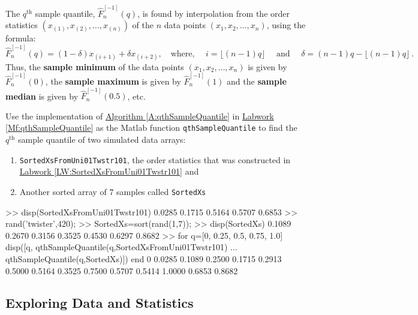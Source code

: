 The $q^{\text{th}}$ sample quantile, $ \widehat{F}_n^{[-1]}(q)$, is found by interpolation from the order statistics $(x_{(1)},x_{(2)},\ldots,x_{(n)})$ of the $n$ data points $(x_1,x_2,\ldots,x_n)$, using the formula:
\[
 \widehat{F}_n^{[-1]}(q) = (1 - \delta) x_{(i+1)} + \delta x_{(i+2)}, \quad \text{where, }
\quad i = \lfloor (n-1) q \rfloor  \quad \text{ and }
\quad \delta = (n-1) q -  \lfloor (n-1) q \rfloor \ .
\]
Thus, the {\bf sample minimum} of the data points $(x_1,x_2,\ldots,x_n)$ is given by $ \widehat{F}_n^{[-1]}(0)$, the {\bf sample maximum} is given by $ \widehat{F}_n^{[-1]}(1)$ and the {\bf sample median} is given by $ \widehat{F}_n^{[-1]}(0.5)$, etc.
\begin{labwork}\label{LW:qthSampleQuantile}
Use the implementation of \hyperref[A:qthSampleQuantile]{Algorithm \ref*{A:qthSampleQuantile}} in \hyperref[Mf:qthSampleQuantile]{Labwork \ref*{Mf:qthSampleQuantile}} as the {\sc Matlab} function {\tt qthSampleQuantile} to find the $q^{\text{th}}$ sample quantile of two simulated data arrays:
\begin{enumerate}
\item {\tt SortedXsFromUni01Twstr101}, the order statistics that was constructed in \hyperref[LW:SortedXsFromUni01Twstr101]{Labwork \ref*{LW:SortedXsFromUni01Twstr101}} and
\item Another sorted array of $7$ samples called {\tt SortedXs}
\end{enumerate}
\begin{VrbM}
>> disp(SortedXsFromUni01Twstr101)
    0.0285    0.1715    0.5164    0.5707    0.6853
>> rand('twister',420);
>> SortedXs=sort(rand(1,7));
>> disp(SortedXs)
    0.1089    0.2670    0.3156    0.3525    0.4530    0.6297    0.8682
>> for q=[0, 0.25, 0.5, 0.75, 1.0]
       disp([q, qthSampleQuantile(q,SortedXsFromUni01Twstr101) ...
                qthSampleQuantile(q,SortedXs)])
   end
         0    0.0285    0.1089
    0.2500    0.1715    0.2913
    0.5000    0.5164    0.3525
    0.7500    0.5707    0.5414
    1.0000    0.6853    0.8682
\end{VrbM}
\end{labwork}

\subsection{Exploring Data and Statistics}\label{S:ExploringData}


